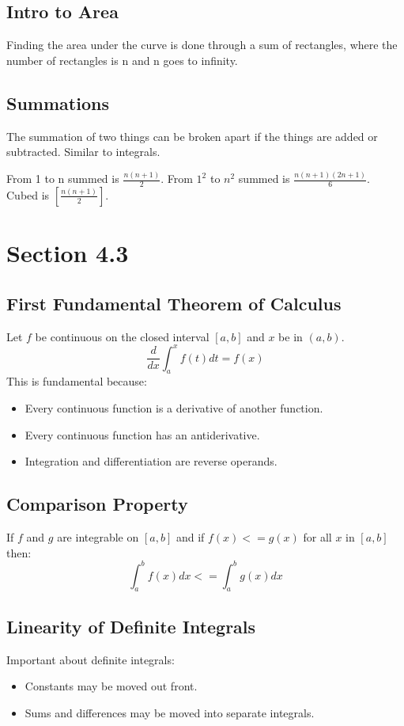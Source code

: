 \documentclass[11pt]{article}
\begin{document}
    \subsection{Intro to Area}
    Finding the area under the curve is done through a sum of rectangles, where
    the number of rectangles is n and n goes to infinity.

    \subsection{Summations}
    The summation of two things can be broken apart if the things are added or
    subtracted.  Similar to integrals.

    From 1 to n summed is $\frac{n(n+1)}{2}$.  From $1^2$ to $n^2$ summed is
    $\frac{n(n+1)(2n+1)}{6}$.  Cubed is $\left[\frac{n(n+1)}{2}\right]$.

\section{Section 4.3}

    \subsection{First Fundamental Theorem of Calculus}
    Let $f$ be continuous on the closed interval $[a,b]$ and $x$ be in $(a,b)$.
    \[
            \frac{d}{dx}\int_{a}^{x}f(t)dt = f(x)
    \]
    This is fundamental because:
    \begin{itemize}
            \item Every continuous function is a derivative of another function.
            \item Every continuous function has an antiderivative.
            \item Integration and differentiation are reverse operands.
    \end{itemize}
    \subsection{Comparison Property}
    If $f$ and $g$ are integrable on $[a,b]$ and if $f(x)<=g(x)$ for all $x$ in
    $[a,b]$ then:
    \[
            \int_{a}^{b}f(x)dx <= \int_{a}^{b}g(x)dx
    \]
    \subsection{Linearity of Definite Integrals}
    Important about definite integrals:
    \begin{itemize}
      \item Constants may be moved out front.
      \item Sums and differences may be moved into separate integrals.
    \end{itemize}
\end{document}
